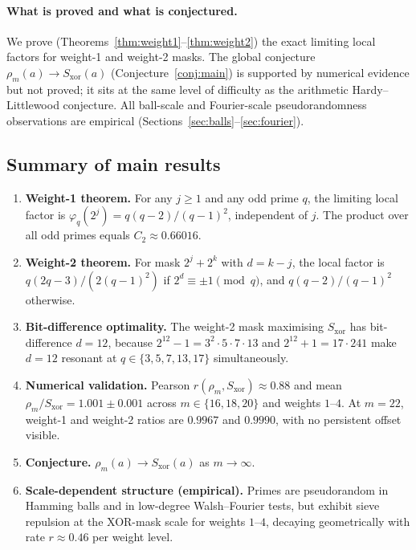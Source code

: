 \documentclass[12pt]{article}
\begin{document}
\paragraph{What is proved and what is conjectured.}
We prove (Theorems~\ref{thm:weight1}--\ref{thm:weight2}) the exact limiting
local factors for weight-1 and weight-2 masks.
The global conjecture $\rho_m(a) \to S_{\mathrm{xor}}(a)$
(Conjecture~\ref{conj:main}) is supported by numerical evidence
but not proved; it sits at the same level of difficulty as the
arithmetic Hardy--Littlewood conjecture.
All ball-scale and Fourier-scale pseudorandomness observations
are empirical (Sections~\ref{sec:balls}--\ref{sec:fourier}).

\subsection{Summary of main results}

\begin{enumerate}[label=(\roman*)]
  \item \textbf{Weight-1 theorem.}
    For any $j \geq 1$ and any odd prime $q$, the limiting local factor is
    $\varphi_q(2^j) = q(q-2)/(q-1)^2$, independent of $j$.
    The product over all odd primes equals $C_2 \approx 0.66016$.

  \item \textbf{Weight-2 theorem.}
    For mask $2^j + 2^k$ with $d = k-j$,
    the local factor is $q(2q-3)/(2(q-1)^2)$ if $2^d \equiv \pm 1 \pmod q$,
    and $q(q-2)/(q-1)^2$ otherwise.

  \item \textbf{Bit-difference optimality.}
    The weight-2 mask maximising $S_{\mathrm{xor}}$ has bit-difference $d = 12$,
    because $2^{12}-1 = 3^2 \cdot 5 \cdot 7 \cdot 13$ and
    $2^{12}+1 = 17 \cdot 241$ make $d = 12$ resonant at $q \in \{3,5,7,13,17\}$
    simultaneously.

  \item \textbf{Numerical validation.}
    Pearson $r(\rho_m, S_{\mathrm{xor}}) \approx 0.88$ and
    mean $\rho_m/S_{\mathrm{xor}} = 1.001 \pm 0.001$
    across $m \in \{16,18,20\}$ and weights $1$--$4$.
    At $m=22$, weight-1 and weight-2 ratios are $0.9967$ and $0.9990$,
    with no persistent offset visible.

  \item \textbf{Conjecture.}
    $\rho_m(a) \to S_{\mathrm{xor}}(a)$ as $m \to \infty$.

  \item \textbf{Scale-dependent structure (empirical).}
    Primes are pseudorandom in Hamming balls and in low-degree Walsh--Fourier
    tests, but exhibit sieve repulsion at the XOR-mask scale for weights $1$--$4$,
    decaying geometrically with rate $r \approx 0.46$ per weight level.
\end{enumerate}
\end{document}
